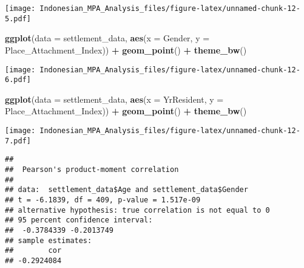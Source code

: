 \documentclass[
]{article}
\newenvironment{Shaded}{\begin{snugshade}}{\end{snugshade}}
\newcommand{\AttributeTok}[1]{\textcolor[rgb]{0.13,0.29,0.53}{#1}}
\newcommand{\CommentTok}[1]{\textcolor[rgb]{0.56,0.35,0.01}{\textit{#1}}}
\newcommand{\FunctionTok}[1]{\textcolor[rgb]{0.13,0.29,0.53}{\textbf{#1}}}
\newcommand{\NormalTok}[1]{#1}
\newcommand{\SpecialCharTok}[1]{\textcolor[rgb]{0.81,0.36,0.00}{\textbf{#1}}}
\begin{document}
\texttt{[image: Indonesian\_MPA\_Analysis\_files/figure-latex/unnamed-chunk-12-5.pdf]}

\begin{Shaded}
\begin{Highlighting}[]
\FunctionTok{ggplot}\NormalTok{(}\AttributeTok{data =}\NormalTok{ settlement\_data, }\FunctionTok{aes}\NormalTok{(}\AttributeTok{x =}\NormalTok{ Gender, }\AttributeTok{y =}\NormalTok{ Place\_Attachment\_Index)) }\SpecialCharTok{+}
  \FunctionTok{geom\_point}\NormalTok{() }\SpecialCharTok{+}
  \FunctionTok{theme\_bw}\NormalTok{()}
\end{Highlighting}
\end{Shaded}

\texttt{[image: Indonesian\_MPA\_Analysis\_files/figure-latex/unnamed-chunk-12-6.pdf]}

\begin{Shaded}
\begin{Highlighting}[]
\FunctionTok{ggplot}\NormalTok{(}\AttributeTok{data =}\NormalTok{ settlement\_data, }\FunctionTok{aes}\NormalTok{(}\AttributeTok{x =}\NormalTok{ YrResident, }\AttributeTok{y =}\NormalTok{ Place\_Attachment\_Index)) }\SpecialCharTok{+}
  \FunctionTok{geom\_point}\NormalTok{() }\SpecialCharTok{+}
  \FunctionTok{theme\_bw}\NormalTok{()}
\end{Highlighting}
\end{Shaded}

\texttt{[image: Indonesian\_MPA\_Analysis\_files/figure-latex/unnamed-chunk-12-7.pdf]}

\begin{Shaded}
\end{Shaded}

\begin{verbatim}
## 
##  Pearson's product-moment correlation
## 
## data:  settlement_data$Age and settlement_data$Gender
## t = -6.1839, df = 409, p-value = 1.517e-09
## alternative hypothesis: true correlation is not equal to 0
## 95 percent confidence interval:
##  -0.3784339 -0.2013749
## sample estimates:
##        cor 
## -0.2924084
\end{verbatim}

\begin{Shaded}
\end{Shaded}
\end{document}
